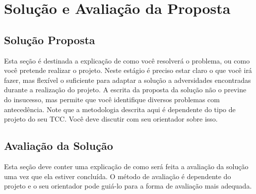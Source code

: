 \chapter{Solução e Avaliação da Proposta}
\section{Solução Proposta}
Esta seção é destinada a explicação de como você resolverá o problema, ou como você pretende realizar o projeto. Neste estágio é preciso estar claro o que você irá fazer, mas flexível o suficiente para adaptar a solução a adversidades encontradas durante a realização do projeto. A escrita da proposta da solução não o previne do insucesso, mas permite que você identifique diversos problemas com antecedência.
Note que a metodologia descrita aqui é dependente do tipo de projeto do seu TCC. Você deve discutir com seu orientador sobre isso. 

\section{Avaliação da Solução}
Esta seção deve conter uma explicação de como será feita a avaliação da solução uma vez que ela estiver concluída. O método de avaliação é dependente do projeto e o seu orientador pode guiá-lo para a forma de avaliação mais adequada.
